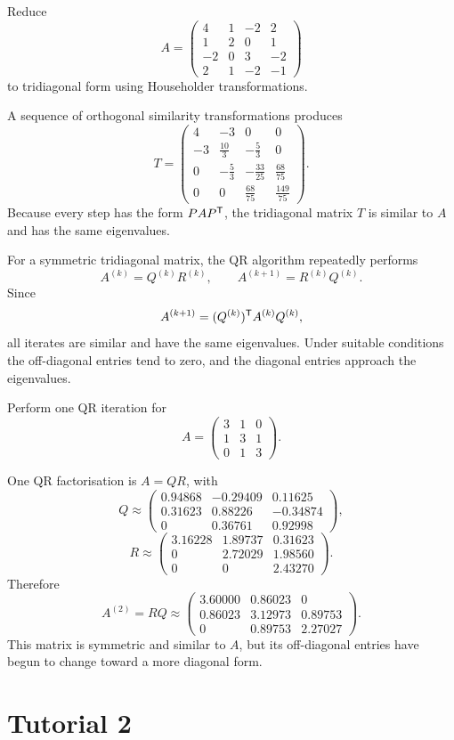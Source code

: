 \begin{example}
Reduce
\[
 A=\begin{pmatrix}
4&1&-2&2\\
1&2&0&1\\
-2&0&3&-2\\
2&1&-2&-1
\end{pmatrix}
\]
to tridiagonal form using Householder transformations.
\end{example}

\begin{solution}[4.5cm]
A sequence of orthogonal similarity transformations produces
\[
 T=\begin{pmatrix}
4&-3&0&0\\[1mm]
-3&\frac{10}{3}&-\frac53&0\\[1mm]
0&-\frac53&-\frac{33}{25}&\frac{68}{75}\\[1mm]
0&0&\frac{68}{75}&\frac{149}{75}
\end{pmatrix}.
\]
Because every step has the form $PAP^{\mathsf T}$, the tridiagonal matrix $T$ is similar to $A$ and has the same eigenvalues.
\end{solution}

For a symmetric tridiagonal matrix, the QR algorithm repeatedly performs
\[
 A^{(k)}=Q^{(k)}R^{(k)},
 \qquad
 A^{(k+1)}=R^{(k)}Q^{(k)}.
\]
Since
\[
 A^{(k+1)}=(Q^{(k)})^{\mathsf T} A^{(k)}Q^{(k)},
\]
all iterates are similar and have the same eigenvalues.  Under suitable conditions the off-diagonal entries tend to zero, and the diagonal entries approach the eigenvalues.

\begin{example}
Perform one QR iteration for
\[
 A=\begin{pmatrix}
3&1&0\\
1&3&1\\
0&1&3
\end{pmatrix}.
\]
\end{example}

\begin{solution}[6.0cm]
One QR factorisation is $A=QR$, with
\[
 Q\approx\begin{pmatrix}
0.94868&-0.29409&0.11625\\
0.31623&0.88226&-0.34874\\
0&0.36761&0.92998
\end{pmatrix},
\]
\[
 R\approx\begin{pmatrix}
3.16228&1.89737&0.31623\\
0&2.72029&1.98560\\
0&0&2.43270
\end{pmatrix}.
\]
Therefore
\[
 A^{(2)}=RQ\approx
\begin{pmatrix}
3.60000&0.86023&0\\
0.86023&3.12973&0.89753\\
0&0.89753&2.27027
\end{pmatrix}.
\]
This matrix is symmetric and similar to $A$, but its off-diagonal entries have begun to change toward a more diagonal form.
\end{solution}

\section*{Tutorial 2}
